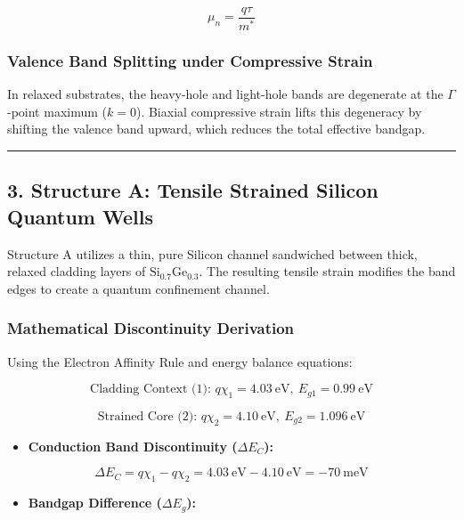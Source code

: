 \documentclass[
]{article}
\providecommand{\tightlist}{%
  \setlength{\itemsep}{0pt}\setlength{\parskip}{0pt}}
\begin{document}
\[\mu_n = \frac{q\tau}{m^*}\]

\subsubsection{Valence Band Splitting under Compressive
Strain}\label{valence-band-splitting-under-compressive-strain}

In relaxed substrates, the heavy-hole and light-hole bands are
degenerate at the \(\Gamma\)-point maximum (\(k=0\)). Biaxial
compressive strain lifts this degeneracy by shifting the valence band
upward, which reduces the total effective bandgap.

\begin{center}\rule{0.5\linewidth}{0.5pt}\end{center}

\subsection{3. Structure A: Tensile Strained Silicon Quantum
Wells}\label{structure-a-tensile-strained-silicon-quantum-wells}

Structure A utilizes a thin, pure Silicon channel sandwiched between
thick, relaxed cladding layers of \(\text{Si}_{0.7}\text{Ge}_{0.3}\).
The resulting tensile strain modifies the band edges to create a quantum
confinement channel.

\subsubsection{Mathematical Discontinuity
Derivation}\label{mathematical-discontinuity-derivation}

Using the Electron Affinity Rule and energy balance equations:

\[\text{Cladding Context (1): } q\chi_1 = 4.03\ \text{eV}, \ E_{g1} = 0.99\ \text{eV}\]

\[\text{Strained Core (2): } q\chi_2 = 4.10\ \text{eV}, \ E_{g2} = 1.096\ \text{eV}\]

\begin{itemize}
\tightlist
\item
  \textbf{Conduction Band Discontinuity (\(\Delta E_C\)):}
\end{itemize}

\[\Delta E_C = q\chi_1 - q\chi_2 = 4.03\ \text{eV} - 4.10\ \text{eV} = -70\ \text{meV}\]

\begin{itemize}
\tightlist
\item
  \textbf{Bandgap Difference (\(\Delta E_g\)):}
\end{itemize}
\end{document}
